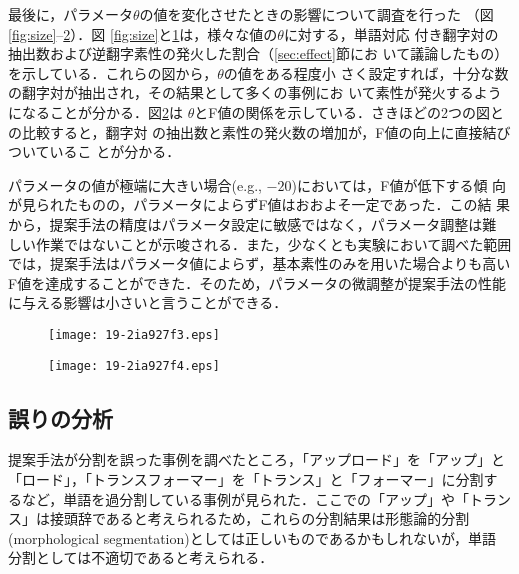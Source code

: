 \documentclass[japanese]{jnlp_1.4}
\begin{document}
最後に，パラメータ$\theta$の値を変化させたときの影響について調査を行った
（図\ref{fig:size}--\ref{fig:threshold}）．図
\ref{fig:size}と\ref{fig:fire}は，様々な値の$\theta$に対する，単語対応
付き翻字対の抽出数および逆翻字素性の発火した割合（\ref{sec:effect}節にお
いて議論したもの）を示している．これらの図から，$\theta$の値をある程度小
さく設定すれば，十分な数の翻字対が抽出され，その結果として多くの事例にお
いて素性が発火するようになることが分かる．図\ref{fig:threshold}は
$\theta$とF値の関係を示している．さきほどの2つの図との比較すると，翻字対
の抽出数と素性の発火数の増加が，F値の向上に直接結びついているこ
とが分かる．

パラメータの値が極端に大きい場合(e.g., $-20$)においては，F値が低下する傾
向が見られたものの，パラメータによらずF値はおおよそ一定であった．この結
果から，提案手法の精度はパラメータ設定に敏感ではなく，パラメータ調整は難
しい作業ではないことが示唆される．また，少なくとも実験において調べた範囲
では，提案手法はパラメータ値によらず，基本素性のみを用いた場合よりも高い
F値を達成することができた．そのため，パラメータの微調整が提案手法の性能
に与える影響は小さいと言うことができる．

\begin{figure}[t]
 \begin{center}
 \texttt{[image: 19-2ia927f3.eps]}
 \end{center}
  \label{fig:fire}
\end{figure}

\begin{figure}[t]
 \begin{center}
 \texttt{[image: 19-2ia927f4.eps]}
 \end{center}
  \label{fig:threshold}
\end{figure}


\subsection{誤りの分析} \label{subsec:error}

提案手法が分割を誤った事例を調べたところ，「アップロード」を「アップ」と
「ロード」，「トランスフォーマー」を「トランス」と「フォーマー」に分割す
るなど，単語を過分割している事例が見られた．ここでの「アップ」や「トラン
ス」は接頭辞であると考えられるため，これらの分割結果は形態論的分割
(morphological segmentation)としては正しいものであるかもしれないが，単語
分割としては不適切であると考えられる．
\end{document}
